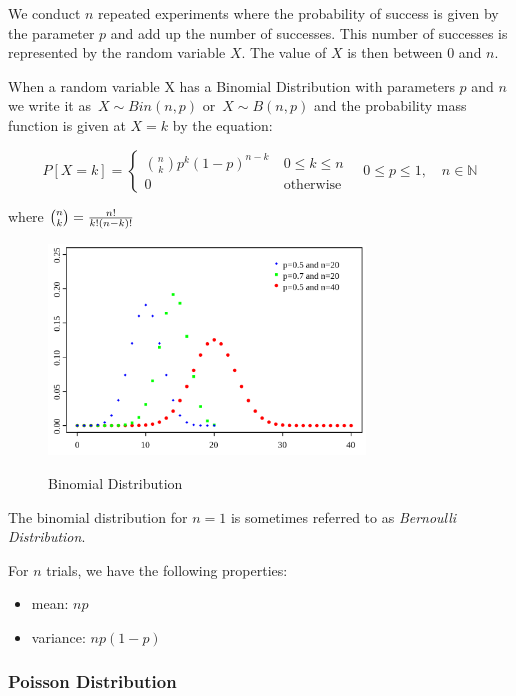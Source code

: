   We conduct $n$ repeated experiments where the probability of success is given by the parameter $p$ and add up the number of successes. This number of successes is represented by the random variable $X$.  The value of $X$ is then between 0 and $n$.

When a random variable X has a Binomial Distribution with parameters $p$ and $n$ we write it as $\,X \sim Bin(n,p)$ or $\,X \sim B(n,p)$ and the probability mass function is given at $X=k$ by the equation:

\begin{equation}
    P\left[X = k\right] = \begin{cases} {n \choose k} p^k \left(1-p\right)^{n-k}\ & 0 \le k \le n \\ 0 & \mbox{otherwise} \end{cases} \quad 0 \leq p \leq 1, \quad n \in \mathbb{N}
\end{equation}

where ${n \choose k}={n! \over k!(n-k)!}$

\begin{figure}
  \centering
  \includegraphics[width=0.75\textwidth]{../Images/Binomial_distribution_pmf.png}\\
  \caption{Binomial Distribution}
\end{figure}

The binomial distribution for $n = 1$ is sometimes referred to as \emph{Bernoulli Distribution}.

 For $n$ trials, we have the following properties:

 \begin{itemize}
   \item mean: $np$
   \item variance: $n p (1-p)$
 \end{itemize}

\subsubsection{Poisson Distribution}

